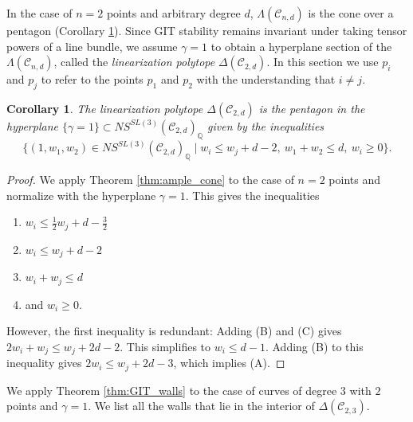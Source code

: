 \documentclass{amsart}
\newcommand{\Q}{\mathbb{Q}}
\newcommand{\mc}{\mathcal}
\numberwithin{equation}{section}
\newtheorem{cor}[prop]{Corollary}
\theoremstyle{definition}
\begin{document}
In the case of $n=2$ points and arbitrary degree $d$, $\Lambda(\mc{C}_{n,d})$ is the cone over a pentagon (Corollary \ref{cor:pentagon}). Since GIT stability remains invariant under taking tensor powers of a line bundle, we assume $\gamma = 1$ to obtain a hyperplane section of the $\Lambda(\mc{C}_{n,d})$, called the \textit{linearization polytope} $\Delta(\mc{C}_{2,d})$. In this section we use $p_i$ and $p_j$ to refer to the points $p_1$ and $p_2$ with the understanding that $i \neq j$.

\begin{cor}\label{cor:pentagon}
    The linearization polytope $\Delta(\mc{C}_{2,d})$ is the pentagon in the hyperplane $\{\gamma =1 \} \subset NS^{SL(3)}(\mc{C}_{2,d})_\Q$ given by the inequalities
$$
\{
(1, w_1, w_2) \in 
NS^{SL(3)}(\mc{C}_{2,d})_\Q
\; \big| \;
w_i \leq w_j + d -2, \ w_1 + w_2 \leq d, \ w_i \geq 0   \}.
$$
\end{cor}
\begin{proof}
We apply Theorem \ref{thm:ample_cone} to the case of $n=2$ points and normalize with the hyperplane $\gamma=1$. This gives the inequalities 
\begin{enumerate}[label=(\Alph*)]
    \item $w_i \leq \frac{1}{2}w_j + d - \frac{3}{2}$
    \item $ w_i \leq w_j +d-2$
    \item $w_i + w_j \leq d$
    \item and $w_i \geq 0.$
\end{enumerate}
However, the first inequality is redundant: Adding (B) and (C) gives $2w_i + w_j \leq w_j + 2d -2$. This simplifies to $w_i \leq d-1$. Adding (B) to this inequality gives $2w_i \leq w_j +2d -3$, which implies (A).

\end{proof}

 We apply Theorem \ref{thm:GIT_walls} to the case of curves of degree $3$ with $2$ points and $\gamma = 1$. We list all the walls that lie in the interior of $\Delta(\mc{C}_{2,3}).$
\end{document}
